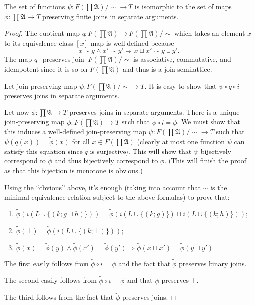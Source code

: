\begin{lem}
  The set of functions $\psi : F \left( \prod \mathfrak{A} \right) / \sim
  \rightarrow T$ is isomorphic to the set of maps $\phi :
  \prod \mathfrak{A} \rightarrow T$ preserving finite joins in separate arguments.
\end{lem}

\begin{proof}
  The quotient map $q : F \left( \prod \mathfrak{A} \right) \rightarrow F
  \left( \prod \mathfrak{A} \right) / \sim$ which takes an element $x$ to its
  equivalence class $[x]$ map is well defined because
  \[ x \sim y \wedge x' \sim y' \Rightarrow x \sqcup x' \sim y \sqcup y' . \]
  The map $q$ \ preserves join. $F \left( \prod \mathfrak{A} \right) / \sim$
  is associative, commutative, and idempotent since it is so on $F \left(
  \prod \mathfrak{A} \right)$ and thus is a join-semilattice.
  
  Let join-preserving map $\psi : F \left( \prod \mathfrak{A} \right) / \sim
  \rightarrow T$. It is easy to show that $\psi \circ q \circ i$ preserves
  joins in separate arguments.
  
  Let now $\phi : \prod \mathfrak{A} \rightarrow T$ preserves joins in
  separate arguments. There is a unique join-preserving map $\tilde{\phi} : F
  \left( \prod \mathfrak{A} \right) \rightarrow T$ such that $\tilde{\phi}
  \circ i = \phi$. We must show that this induces a well-defined
  join-preserving map $\psi : F \left( \prod \mathfrak{A} \right) / \sim
  \rightarrow T$ such that $\psi (q (x)) = \tilde{\phi} (x)$ for all $x \in F
  \left( \prod \mathfrak{A} \right)$ (clearly at most one function $\psi$ can
  satisfy this equation since $q$ is surjective). This will show that $\psi$
  bijectively correspond to $\tilde{\phi}$ and thus bijectively correspond to
  $\phi$. (This will finish the proof as that this bijection is monotone is
  obvious.)
  
  Using the ``obvious'' above, it's enough (taking into account that $\sim$ is
  the minimal equivalence relation subject to the above formulas) to prove
  that:
  \begin{enumerate}
    \item $\tilde{\phi} (i (L \cup \{ (k ; g \sqcup h) \})) = \tilde{\phi} (i
    (L \cup \{ (k ; g) \}) \sqcup i (L \cup \{ (k ; h) \}))$;
    
    \item $\tilde{\phi} (\bot) = \tilde{\phi} (i (L \cup \{ (k ; \bot) \}))$;
    
    \item $\tilde{\phi} (x) = \tilde{\phi} (y) \wedge \tilde{\phi} (x') =
    \tilde{\phi} (y') \Rightarrow \tilde{\phi} (x \sqcup x') = \tilde{\phi} (y
    \sqcup y')$
  \end{enumerate}
  The first easily follows from $\tilde{\phi} \circ i = \phi$ and the fact
  that $\tilde{\phi}$ preserves binary joins.
  
  The second easily follows from $\tilde{\phi} \circ i = \phi$ and that $\phi$
  preserves $\bot$.
  
  The third follows from the fact that $\tilde{\phi}$ preserves joins.
\end{proof}

